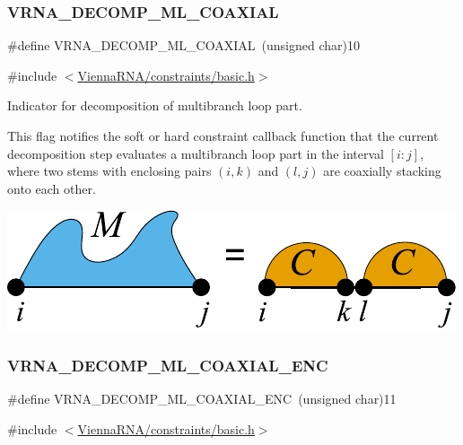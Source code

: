 \subsubsection{\texorpdfstring{VRNA\_DECOMP\_ML\_COAXIAL}{VRNA\_DECOMP\_ML\_COAXIAL}}
{\footnotesize\ttfamily \#define V\+R\+N\+A\+\_\+\+D\+E\+C\+O\+M\+P\+\_\+\+M\+L\+\_\+\+C\+O\+A\+X\+I\+AL~(unsigned char)10}



{\ttfamily \#include $<$\mbox{\hyperlink{constraints_2basic_8h}{Vienna\+R\+N\+A/constraints/basic.\+h}}$>$}



Indicator for decomposition of multibranch loop part. 

This flag notifies the soft or hard constraint callback function that the current decomposition step evaluates a multibranch loop part in the interval $[i:j]$, where two stems with enclosing pairs $(i,k)$ and $(l,j)$ are coaxially stacking onto each other.

 
\begin{DoxyImageNoCaption}
  \mbox{\includegraphics[width=\textwidth,height=\textheight/2,keepaspectratio=true]{decomp_ml_coaxial}}
\end{DoxyImageNoCaption}
 \mbox{\label{group__constraints_ga0224727f7b8ad2f23eb0a3fd28d8b3fb}} 
\subsubsection{\texorpdfstring{VRNA\_DECOMP\_ML\_COAXIAL\_ENC}{VRNA\_DECOMP\_ML\_COAXIAL\_ENC}}
{\footnotesize\ttfamily \#define V\+R\+N\+A\+\_\+\+D\+E\+C\+O\+M\+P\+\_\+\+M\+L\+\_\+\+C\+O\+A\+X\+I\+A\+L\+\_\+\+E\+NC~(unsigned char)11}



{\ttfamily \#include $<$\mbox{\hyperlink{constraints_2basic_8h}{Vienna\+R\+N\+A/constraints/basic.\+h}}$>$}



